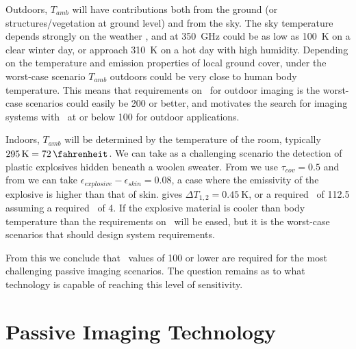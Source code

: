 Outdoors, $T_{amb}$ will have contributions both from the ground (or structures/vegetation at ground level) and from the sky.
The sky temperature depends strongly on the weather \cite{appleby_standoff_2007}, and at \SI{350}{\GHz} could be as low as \SI{100}{\K} on a clear winter day, or approach \SI{310}{\K} on a hot day with high humidity.
Depending on the temperature and emission properties of local ground cover, under the worst-case scenario $T_{amb}$ outdoors could be very close to human body temperature.
This means that requirements on \NETD\ for outdoor imaging is the worst-case scenarios could easily be \SI{200}{\mK} or better, and motivates the search for imaging systems with \NETD\ at or below \SI{100}{\mK} for outdoor applications. 

Indoors, $T_{amb}$ will be determined by the temperature of the room, typically $\SI{295}{\K} = \SI{72}{\fahrenheit}$.
We can take as a challenging scenario the detection of plastic explosives hidden beneath a woolen sweater.
From \cite{bjarnason_millimeter-wave_2004} we use $\tau_{cov} = 0.5$ and from \cite{appleby_standoff_2007} we can take $\epsilon_{explosive} - \epsilon_{skin} = 0.08$, a case where the emissivity of the explosive is higher than that of skin.
 gives $\Delta T_{1,2} = \SI{0.45}{\K}$, or a required \NETD\ of \SI{112.5}{\mK} assuming a required \SN\ of 4.
If the explosive material is cooler than body temperature than the requirements on \NETD\ will be eased, but it is the worst-case scenarios that should design system requirements.

From this we conclude that \NETD\ values of \SI{100}{\mK} or lower are required for the most challenging passive imaging scenarios.
The question remains as to what technology is capable of reaching this level of sensitivity.

\section{Passive Imaging Technology}

